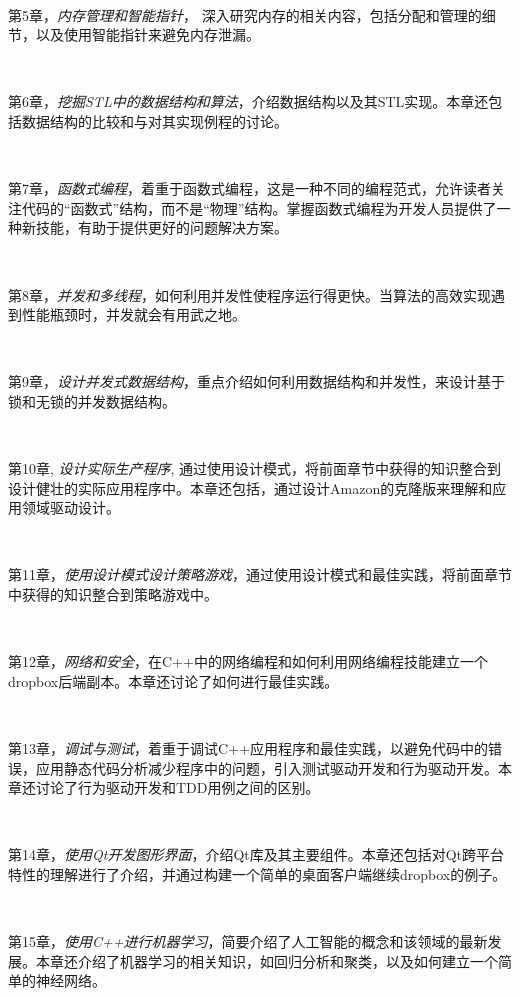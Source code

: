 \noindent\textbf{}\ \par
\textsf{第5章}，\textit{内存管理和智能指针}， 深入研究内存的相关内容，包括分配和管理的细节，以及使用智能指针来避免内存泄漏。

\noindent\textbf{}\ \par
\textsf{第6章}，\textit{挖掘STL中的数据结构和算法}，介绍数据结构以及其STL实现。本章还包括数据结构的比较和与对其实现例程的讨论。

\noindent\textbf{}\ \par
\textsf{第7章}，\textit{函数式编程}，着重于函数式编程，这是一种不同的编程范式，允许读者关注代码的“函数式”结构，而不是“物理”结构。掌握函数式编程为开发人员提供了一种新技能，有助于提供更好的问题解决方案。

\noindent\textbf{}\ \par
\textsf{第8章}，\textit{并发和多线程}，如何利用并发性使程序运行得更快。当算法的高效实现遇到性能瓶颈时，并发就会有用武之地。

\noindent\textbf{}\ \par
\textsf{第9章}，\textit{设计并发式数据结构}，重点介绍如何利用数据结构和并发性，来设计基于锁和无锁的并发数据结构。

\noindent\textbf{}\ \par
\textsf{第10章}, \textit{设计实际生产程序}, 通过使用设计模式，将前面章节中获得的知识整合到设计健壮的实际应用程序中。本章还包括，通过设计Amazon的克隆版来理解和应用领域驱动设计。

\noindent\textbf{}\ \par
\textsf{第11章}，\textit{使用设计模式设计策略游戏}，通过使用设计模式和最佳实践，将前面章节中获得的知识整合到策略游戏中。

\noindent\textbf{}\ \par
\textsf{第12章}，\textit{网络和安全}，在C++中的网络编程和如何利用网络编程技能建立一个dropbox后端副本。本章还讨论了如何进行最佳实践。

\noindent\textbf{}\ \par
\textsf{第13章}，\textit{调试与测试}，着重于调试C++应用程序和最佳实践，以避免代码中的错误，应用静态代码分析减少程序中的问题，引入测试驱动开发和行为驱动开发。本章还讨论了行为驱动开发和TDD用例之间的区别。

\noindent\textbf{}\ \par
\textsf{第14章}，\textit{使用Qt开发图形界面}，介绍Qt库及其主要组件。本章还包括对Qt跨平台特性的理解进行了介绍，并通过构建一个简单的桌面客户端继续dropbox的例子。

\noindent\textbf{}\ \par
\textsf{第15章}，\textit{使用C++进行机器学习}，简要介绍了人工智能的概念和该领域的最新发展。本章还介绍了机器学习的相关知识，如回归分析和聚类，以及如何建立一个简单的神经网络。

